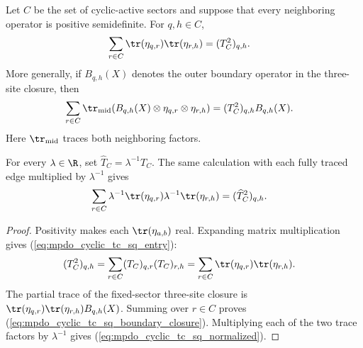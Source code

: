 \begin{lemma}
    \label{thm:mpdo_cyclic_active_three_boundary_trace}
    \leanok
    Let $C$ be the set of cyclic-active sectors and suppose that every
    neighboring operator is positive semidefinite. For $q,h\in C$,
    \begin{align}
        \sum_{r\in C}\tr(\eta_{q,r})\tr(\eta_{r,h})
         & =(T_C^2)_{q,h}.
        \label{eq:mpdo_cyclic_tc_sq_entry}
    \end{align}
    More generally, if $B_{q,h}(X)$ denotes the outer boundary operator in
    the three-site closure, then
    \begin{align}
        \sum_{r\in C}\tr_{\mathrm{mid}}
        (B_{q,h}(X)\otimes\eta_{q,r}\otimes\eta_{r,h})
         & =(T_C^2)_{q,h}B_{q,h}(X).
        \label{eq:mpdo_cyclic_tc_sq_boundary_closure}
    \end{align}
    Here $\tr_{\mathrm{mid}}$ traces both neighboring factors.

    For every $\lambda\in\R$, set
    $\widehat T_C=\lambda^{-1}T_C$. The same calculation with each fully
    traced edge multiplied by $\lambda^{-1}$ gives
    \begin{align}
        \sum_{r\in C}
        \lambda^{-1}\tr(\eta_{q,r})
        \lambda^{-1}\tr(\eta_{r,h})
         & =(\widehat T_C^2)_{q,h}.
        \label{eq:mpdo_cyclic_tc_sq_normalized}
    \end{align}
\end{lemma}

\begin{proof}\leanok
    Positivity makes each $\tr(\eta_{a,b})$ real. Expanding matrix
    multiplication gives (\ref{eq:mpdo_cyclic_tc_sq_entry}):
    \begin{align}
        (T_C^2)_{q,h}
         & =\sum_{r\in C}(T_C)_{q,r}(T_C)_{r,h}
        =\sum_{r\in C}\tr(\eta_{q,r})\tr(\eta_{r,h}).
        \notag
    \end{align}
    The partial trace of the fixed-sector three-site closure is
    $\tr(\eta_{q,r})\tr(\eta_{r,h})B_{q,h}(X)$.
    Summing over $r\in C$ proves (\ref{eq:mpdo_cyclic_tc_sq_boundary_closure}). Multiplying each of the
    two trace factors by $\lambda^{-1}$ gives (\ref{eq:mpdo_cyclic_tc_sq_normalized}).
\end{proof}

